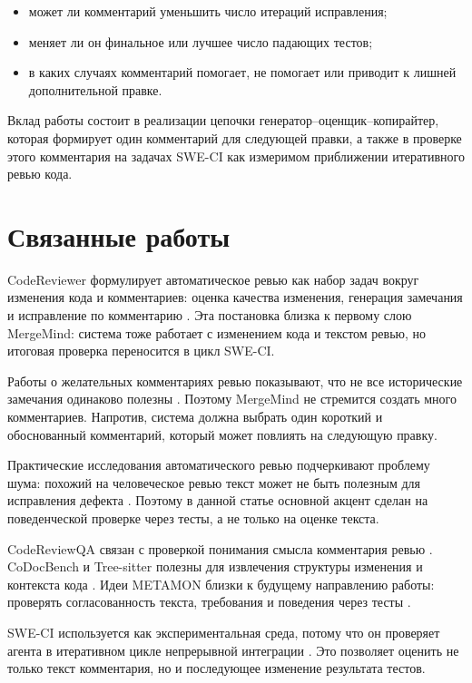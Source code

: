 \documentclass[12pt,a4paper]{article}
\begin{document}
\begin{itemize}
  \item может ли комментарий уменьшить число итераций исправления;
  \item меняет ли он финальное или лучшее число падающих тестов;
  \item в каких случаях комментарий помогает, не помогает или приводит к
    лишней дополнительной правке.
\end{itemize}

Вклад работы состоит в реализации цепочки генератор--оценщик--копирайтер,
которая формирует один комментарий для следующей правки, а также в проверке
этого комментария на задачах SWE-CI как измеримом приближении итеративного
ревью кода.

\section{Связанные работы}

CodeReviewer формулирует автоматическое ревью как набор задач вокруг изменения
кода и комментариев: оценка качества изменения, генерация замечания и
исправление по комментарию \cite{codereviewer}. Эта постановка близка к
первому слою MergeMind: система тоже работает с изменением кода и текстом
ревью, но итоговая проверка переносится в цикл SWE-CI.

Работы о желательных комментариях ревью показывают, что не все исторические
замечания одинаково полезны \cite{desiview}. Поэтому MergeMind не стремится
создать много комментариев. Напротив, система должна выбрать один короткий и
обоснованный комментарий, который может повлиять на следующую правку.

Практические исследования автоматического ревью подчеркивают проблему шума:
похожий на человеческое ревью текст может не быть полезным для исправления
дефекта \cite{acrpractice,defectfocused}. Поэтому в данной статье основной
акцент сделан на поведенческой проверке через тесты, а не только на оценке
текста.

CodeReviewQA связан с проверкой понимания смысла комментария ревью
\cite{codereviewqa}. CoDocBench и Tree-sitter полезны для извлечения структуры
изменения и контекста кода \cite{codocbench,treesitter}. Идеи METAMON близки
к будущему направлению работы: проверять согласованность текста, требования и
поведения через тесты \cite{metamon}.

SWE-CI используется как экспериментальная среда, потому что он проверяет агента
в итеративном цикле непрерывной интеграции \cite{sweci}. Это позволяет оценить
не только текст комментария, но и последующее изменение результата тестов.
\end{document}
